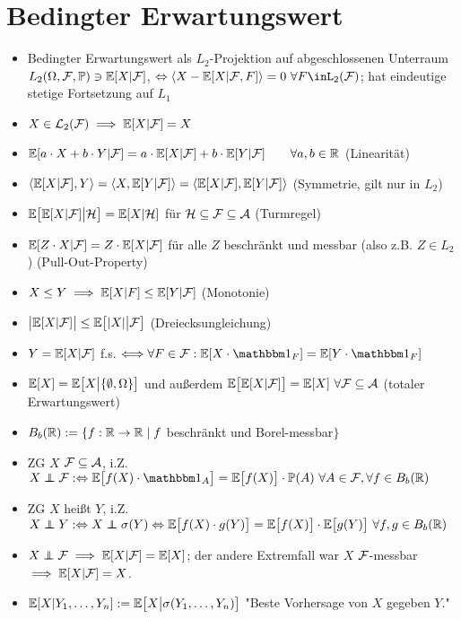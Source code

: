 \documentclass[12pt]{scrartcl}
\begin{document}
	\section{Bedingter Erwartungswert}
	\begin{itemize}
		\item Bedingter Erwartungswert als $L_2$-Projektion auf abgeschlossenen Unterraum $L_2(\Omega,\mathcal{F},\mathbb{P})\ni\mathbb{E}[X|\mathcal{F}]$, $\gdw\langle X-\E[X| \F,F]\rangle=0~\forall F\inL_2(\F)$; hat eindeutige stetige Fortsetzung auf $L_1$
		\item $X\in\mathcal{L}_2(\mathcal{F})\implies\mathbb{E}[X|\mathcal{F}]=X$
		\item $\mathbb{E}[a\cdot X+b\cdot Y|\mathcal{F}]=a\cdot\mathbb{E}[X|\mathcal{F}]+b\cdot\mathbb{E}[Y|\mathcal{F}]\qquad\forall a,b\in\mathbb{R}$ (Linearität)
		\item $\langle\mathbb{E}[X|\mathcal{F}],Y\rangle=\langle X,\mathbb{E}[Y|\mathcal{F}]\rangle=\langle\mathbb{E}[X|\mathcal{F}],\mathbb{E}[Y|\mathcal{F}]\rangle$ (Symmetrie, gilt nur in $L_2$)
		\item $\mathbb{E}\big[\mathbb{E}[X|\mathcal{F}]\big|\mathcal{H}\big]=\mathbb{E}[X|\mathcal{H}]$ für $\mathcal{H}\subseteq\mathcal{F}\subseteq\mathcal{A}$ (Turmregel)
		\item $\mathbb{E}[Z\cdot X|\mathcal{F}]=Z\cdot\mathbb{E}[X|\mathcal{F}]$ für alle $Z$ beschränkt und messbar (also z.B. $Z\in L_2$) (Pull-Out-Property)
		\item $X\leq Y\implies \mathbb{E}[X|F]\leq\mathbb{E}[Y|\mathcal{F}]$ (Monotonie)
		\item $\big|\mathbb{E}[X|\mathcal{F}]\big|\leq\mathbb{E}\big[|X|\big|\mathcal{F}\big]$ (Dreiecksungleichung)
		\item $Y=\mathbb{E}[X|\mathcal{F}]$ f.s. $\Longleftrightarrow\forall F\in\F:\E[X\cdot\indi_F]=\E[Y\cdot\indi_F]$
		\item $\mathbb{E}[X]=\mathbb{E}\big[X\big|\lbrace\emptyset,\Omega\rbrace\big]$ und außerdem $\mathbb{E}\big[\mathbb{E}[X|\mathcal{F}]\big]=\mathbb{E}[X]~\forall\mathcal{F}\subseteq\mathcal{A}$ (totaler Erwartungswert)
		\item $B_b(\mathbb{R}):=\lbrace f:\mathbb{R}\to\mathbb{R}\mid f$ beschränkt und Borel-messbar$\rbrace$
		\item ZG $X$  $\mathcal{F}\subseteq\mathcal{A}$, i.Z. $X\unab\F:\gdw\E\big[f(X)\cdot\indi_A\big]=\E\big[f(X)\big]\cdot\P(A)~\forall A\in\F,\forall f\in B_b(\R)$
		\item ZG $X$ heißt  $Y$, i.Z. $X\unab Y:\gdw X\unab\sigma(Y)\gdw\E\big[f(X)\cdot g(Y)\big]=\E\big[f(X)\big]\cdot\E\big[g(Y)\big]~\forall f,g\in B_b(\R)$
		\item $X\unab\F\implies\E[X|\F]=\E[X]$; der andere Extremfall war $X$ $\mathcal{F}$-messbar $\implies\mathbb{E}[X|\mathcal{F}]=X$.
		\item $\mathbb{E}[X|Y_1,\ldots,Y_n]:=\mathbb{E}\big[X\big|\sigma(Y_1,\ldots,Y_n)\big]$ "Beste Vorhersage von $X$ gegeben $Y$."
	\end{itemize}
	
\end{document}
